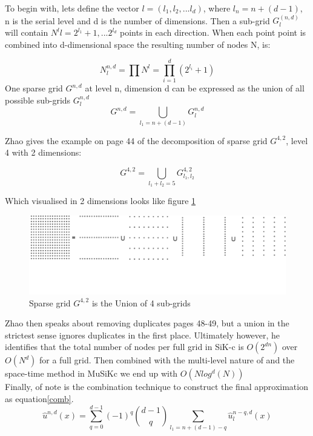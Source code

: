 \documentclass[a4paper]{amsart}
\begin{document}
To begin with, lets define the vector $l = (l_{1}, l_{2}, ... l_{d})$, where $l_{n} = n + (d - 1)$, n is the serial level and d is the number of dimensions. Then a sub-grid $G_{l}^(n,d)$ will contain $N^l{l} = {2^{l_{1}} + 1, ... 2^{l_{d}}}$ points in each direction. When each point point is combined into d-dimensional space the resulting number of nodes N, is:

\begin{equation}
N_{l}^{n,d} = \prod N^{l} = \prod^{d}_{i=1}(2^{l_{i}} + 1)
\label{NMatrix}
\end{equation}
One sparse grid $G^{n,d}$ at level n, dimension d can be expressed as the union of all possible sub-grids $G_{l}^{n,d}$
\begin{equation}
G^{n,d} = \bigcup_{l_{1}=n+(d-1)} G_{l}^{n,d}
\label{SparseGrid}
\end{equation}

Zhao gives the example on page 44 \cite{mski0} of the decomposition of sparse grid $G^{4,2}$, level 4 with 2 dimensions:

\begin{equation}
G^{4,2} = \bigcup_{l_{1}+l_{2} = 5} G^{4,2}_{l_{1},l_{2}}
\end{equation}

Which visualised in 2 dimensions looks like figure \ref{fig:union}
\begin{figure}[h]
\centering
\includegraphics[scale=0.2]{UnionAll.png}
\caption {Sparse grid $G^{4,2}$ is the Union of 4 sub-grids}
\label {fig:union}
\end{figure}

Zhao then speaks about removing duplicates \cite{misk0} pages 48-49, but a union in the strictest sense ignores duplicates in the first place. Ultimately however, he identifies that the total number of nodes per full grid in SiK-c is $O(2^{dn})$ over $O(N^{d})$ for a full grid. Then combined with the multi-level nature of and the space-time method in MuSiKc we end up with $O(Nlog^{d}(N))$\\

Finally, of note is the combination technique to construct the final approximation as equation\ref{comb}.
\begin{equation}
\hat u^{n,d}(x) = \sum^{d-1}_{q=0}(-1)^q \binom{d-1}{q} \sum_{l_{1}=n+(d-1)-q} \hat u_{l}^{n-q,d}(x)
\label{comb}
\end{equation}
\newpage
\end{document}
